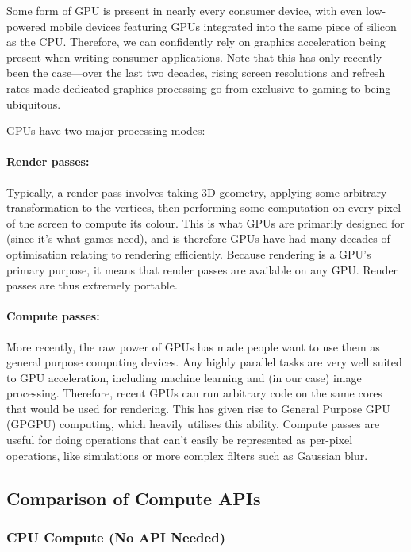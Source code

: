 \documentclass[12pt]{article}
\begin{document}
Some form of GPU is present in nearly every consumer device, with even low-powered mobile devices
featuring GPUs integrated into the same piece of silicon as the CPU.  Therefore, we can confidently
rely on graphics acceleration being present when writing consumer applications.  Note that this has
only recently been the case---over the last two decades, rising screen resolutions and refresh
rates made dedicated graphics processing go from exclusive to gaming to being ubiquitous.

GPUs have two major processing modes:

\paragraph{Render passes:} Typically, a render pass involves taking 3D geometry, applying some
arbitrary transformation to the vertices, then performing some computation on every pixel of the
screen to compute its colour.  This is what GPUs are primarily designed for (since it's what games
need), and is therefore GPUs have had many decades of optimisation relating to rendering
efficiently.  Because rendering is a GPU's primary purpose, it means that render passes are
available on any GPU.  Render passes are thus extremely portable.

\paragraph{Compute passes:} More recently, the raw power of GPUs has made people want to use them as
general purpose computing devices.  Any highly parallel tasks are very well suited to GPU
acceleration, including machine learning and (in our case) image processing.  Therefore, recent GPUs
can run arbitrary code on the same cores that would be used for rendering.  This has given rise to
General Purpose GPU (GPGPU) computing, which heavily utilises this ability.  Compute passes are
useful for doing operations that can't easily be represented as per-pixel operations, like
simulations or more complex filters such as Gaussian blur.

\subsection{Comparison of Compute APIs}

\subsubsection{CPU Compute (No API Needed)}
\end{document}
